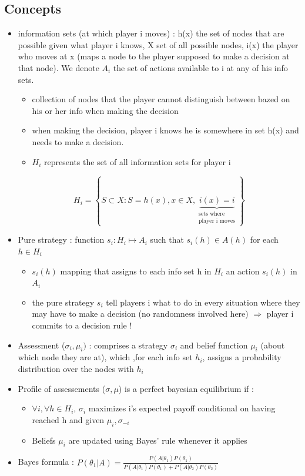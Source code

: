 \documentclass{article}
\begin{document}
\subsection{Concepts}
\begin{itemize}
    \item information sets (at which player i moves) : h(x) the set of nodes that are possible given what player i knows, X set of all possible nodes, i(x) the player who moves at x (maps a node to the player supposed to make a decision at that node). We denote $A_i$ the set of actions available to i at any of his info sets.
    \begin{itemize}
        \item collection of nodes that the player cannot distinguish between bazed on his or her info when making the decision
        \item when making the decision, player i knows he is somewhere in set h(x) and needs to make a decision. 
        \item $H_i$ represents the set of all information sets for player i
    \end{itemize}
    \begin{equation}
        H_i = \left\{S \subset X : S=h(x), x\in X, \underbrace{i(x)=i}_{\substack{\text{sets where}\\\text{player i moves}}}\right\}
    \end{equation}
    \item Pure strategy : function $s_i : H_i \mapsto A_i$ such that $s_i(h)\in A(h)$ for each $h \in H_i$
    \begin{itemize}
        \item $s_i(h)$ mapping that assigns to each info set h in $H_i$ an action $s_i(h)$ in $A_i$
        \item the pure strategy $s_i$ tell players i what to do in every situation where they may have to make a decision (no randomness involved here) $\Longrightarrow$ player i commits to a decision rule !
    \end{itemize}
    \item Assessment ($\sigma_i,\mu_i)$ : comprises a strategy $\sigma_i$ and belief function $\mu_i$ (about which node they are at), which ,for each info set $h_i$,  assigns a probability distribution over the nodes with $h_i$
    \item Profile of assessements ($\sigma,\mu$) is a perfect bayesian equilibrium if : 
    \begin{itemize}
        \item $\forall i,
        \forall h\in H_i$, $\sigma_i$ maximizes i's expected payoff conditional on having reached h and given $\mu_i, \sigma_{-i}$
        \item Beliefs $\mu_i$ are updated using Bayes' rule whenever it applies
    \end{itemize}
    \item Bayes formula : $P(\theta_1|A) = \frac{P(A|\theta_1)P(\theta_1)}{P(A|\theta_1)P(\theta_1) + P(A|\theta_2)P(\theta_2)}$
\end{itemize}
\end{document}
